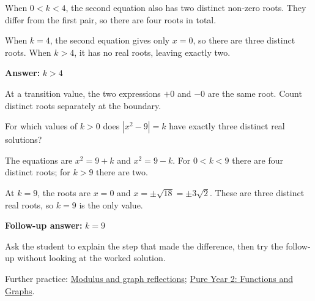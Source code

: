 \documentclass[11pt,a4paper]{article}
\newcommand{\smallheading}[1]{\par\vspace{9pt}{\large\bfseries #1}\par\vspace{1pt}}
\begin{document}
When \(0<k<4\), the second equation also has two distinct non-zero roots. They differ from the first pair, so there are four roots in total.

When \(k=4\), the second equation gives only \(x=0\), so there are three distinct roots. When \(k>4\), it has no real roots, leaving exactly two.

\textbf{Answer:} \(k>4\)\par
\smallheading{What to notice}
At a transition value, the two expressions \(+0\) and \(-0\) are the same root. Count distinct roots separately at the boundary.\par
\smallheading{Matched follow-up}
For which values of \(k>0\) does \(|x^2-9|=k\) have exactly three distinct real solutions?\par
The equations are \(x^2=9+k\) and \(x^2=9-k\). For \(0<k<9\) there are four distinct roots; for \(k>9\) there are two.

At \(k=9\), the roots are \(x=0\) and \(x=\pm\sqrt{18}=\pm3\sqrt2\). These are three distinct real roots, so \(k=9\) is the only value.

\textbf{Follow-up answer:} \(k=9\)\par
\vfill\smallheading{Teaching note}
Ask the student to explain the step that made the difference, then try the follow-up without looking at the worked solution.\par
{\small Further practice: \href{https://maths.arijasad.com/modulus-and-graphs.html}{Modulus and graph reflections}; \href{https://maths.arijasad.com/edexcel-pure-year-2.html#chapter-2}{Pure Year 2: Functions and Graphs}.}
\end{document}
